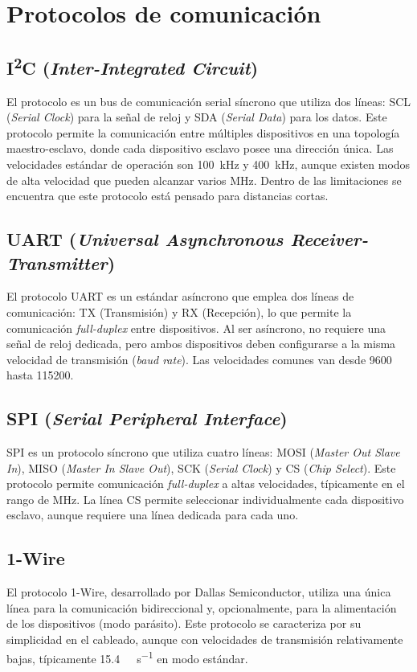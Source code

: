 
\chapter{Protocolos de comunicación} %

\label{AppendixC} %


\section{I\textsuperscript{2}C (\textit{Inter-Integrated Circuit})}
El protocolo \IIC es un bus de comunicación serial síncrono que utiliza dos líneas: SCL (\textit{Serial Clock}) para la señal de reloj y SDA (\textit{Serial Data}) para los datos. Este protocolo permite la comunicación entre múltiples dispositivos en una topología maestro-esclavo, donde cada dispositivo esclavo posee una dirección única. Las velocidades estándar de operación son \SI{100}{\kilo\hertz} y \SI{400}{\kilo\hertz}, aunque existen modos de alta velocidad que pueden alcanzar varios \si{\mega\hertz}. Dentro de las limitaciones se encuentra que este protocolo está pensado para distancias cortas. 

\section{UART (\textit{Universal Asynchronous Receiver-Transmitter})}
El protocolo UART es un estándar asíncrono que emplea dos líneas de comunicación: TX (Transmisión) y RX (Recepción), lo que permite la comunicación \textit{full-duplex} entre dispositivos. Al ser asíncrono, no requiere una señal de reloj dedicada, pero ambos dispositivos deben configurarse a la misma velocidad de transmisión (\textit{baud rate}). Las velocidades comunes van desde \SI{9600}{\baud} hasta \SI{115200}{\baud}.

\section{SPI (\textit{Serial Peripheral Interface})}
SPI es un protocolo síncrono que utiliza cuatro líneas: MOSI (\textit{Master Out Slave In}), MISO (\textit{Master In Slave Out}), SCK (\textit{Serial Clock}) y CS (\textit{Chip Select}). Este protocolo permite comunicación \textit{full-duplex} a altas velocidades, típicamente en el rango de \si{\mega\hertz}. La línea CS permite seleccionar individualmente cada dispositivo esclavo, aunque requiere una línea dedicada para cada uno.

\section{1-Wire}
El protocolo 1-Wire, desarrollado por Dallas Semiconductor, utiliza una única línea para la comunicación bidireccional y, opcionalmente, para la alimentación de los dispositivos (modo parásito). Este protocolo se caracteriza por su simplicidad en el cableado, aunque con velocidades de transmisión relativamente bajas, típicamente \SI{15.4}{\kilo\bit\per\second} en modo estándar.